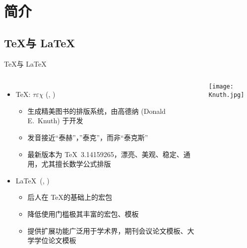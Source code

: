 \section{简介}
\subsection{\TeX 与 \LaTeX}

\begin{frame}[fragile]{\TeX 与 \LaTeX}
  \begin{columns}[T]
    \begin{itemize}
      \item \TeX: $\tau\varepsilon\chi$ (,
        )
        \begin{itemize}
          \item 生成精美图书的排版系统，由高德纳 (Donald E.~Knuth) 于开发
          \item 发音接近``泰赫''，''泰克''，而非``泰克斯''
          \item 最新版本为 \TeX\ 3.14159265，漂亮、美观、稳定、通用，尤其擅长数学公式排版
        \end{itemize}
      \item \LaTeX\ (, )
        \begin{itemize}
          \item 后人在 \TeX 的基础上的宏包
          \item 降低使用门槛极其丰富的宏包、模板 
          \item 提供扩展功能广泛用于学术界，期刊会议论文模板、大学学位论文模板
        \end{itemize}
    \end{itemize}
    \vspace*{10mm}
    \texttt{[image: Knuth.jpg]}

      
  \end{columns}
\end{frame}

